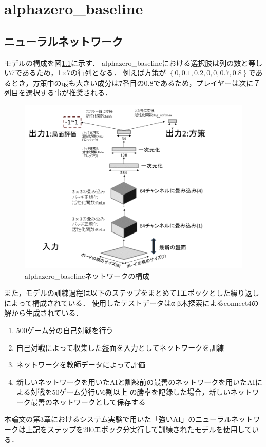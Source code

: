 \chapter{alphazero\_baseline}
\label{chap:baseline}
\section{ニューラルネットワーク}
モデルの構成を図\ref{fig:baselineNetwork}に示す．
alphazero\_baselineにおける選択肢は列の数と等しい7であるため，1$\times$7の行列となる．
例えば方策が
$\left\{0, 0.1, 0.2, 0, 0, 0.7, 0.8\right\}$であるとき，方策中の最も大きい成分は7番目の0.8であるため，プレイヤーは次に７列目を選択する事が推奨される．
\begin{figure}[t]
	\centering
	\includegraphics[width=\linewidth]{./figure/baselineNetwork.png}
	\caption{alphazero\_baselineネットワークの構成}
	\label{fig:baselineNetwork}
\end{figure}
また，モデルの訓練過程は以下のステップをまとめて1エポックとした繰り返しによって構成されている．
使用したテストデータ\cite{dataset}はα-β木探索によるconnect4の解から生成されている\cite{scoring}．
\begin{enumerate}
	\item 500ゲーム分の自己対戦を行う
	\item 自己対戦によって収集した盤面を入力としてネットワークを訓練
    \item ネットワークを教師データによって評価
    \item 新しいネットワークを用いたAIと訓練前の最善のネットワークを用いたAIによる対戦を50ゲーム分行い6割以上
    の勝率を記録した場合，新しいネットワーク最善のネットワークとして保存する

\end{enumerate}
本論文の第3章におけるシステム実験で用いた「強いAI」のニューラルネットワークは上記をステップを200エポック分実行して訓練されたモデルを使用している．

